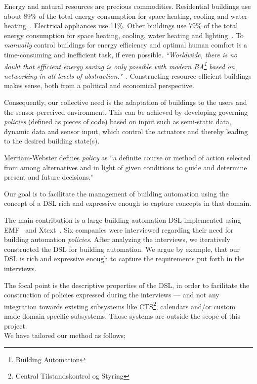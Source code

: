 Energy and natural resources are precious commodities. Residential buildings use about 89\% of the total energy consumption for space heating, cooling and water heating~\cite{janssen2004towards}. Electrical appliances use 11\%. Other buildings use 79\% of the total energy consumption for space heating, cooling, water heating and lighting~\cite{janssen2004towards}. To \textit{manually} control buildings for energy efficiency and optimal human comfort is a time-consuming and inefficient task, if even possible. \textit{``Worldwide, there is no doubt that efficient energy saving is only possible with modern BA\footnote{Building Automation} based on networking in all levels of abstraction."}~\cite{dietrich2010communication}. Constructing resource efficient buildings makes sense, both from a political and economical perspective. 

Consequently, our collective need is the adaptation of buildings to the users and the sensor-perceived environment. This can be achieved by developing governing \textit{policies} (defined as pieces of code) based on input such as semi-static data, dynamic data and sensor input, which control the actuators and thereby leading to the desired building state(s).

Merriam-Webster defines \textit{policy} as ``a definite course or method of action selected from among alternatives and in light of given conditions to guide and determine present and future decisions."

Our goal is to facilitate the management of building automation using the concept of a DSL rich and expressive enough to capture concepts in that domain.

The main contribution is a large building automation DSL implemented using EMF~\cite{emf} and Xtext~\cite{xtext}. Six companies were interviewed regarding their need for building automation \textit{policies}. After analyzing the interviews, we iteratively constructed the DSL for building automation. We argue by example, that our DSL is rich and expressive enough to capture the requirements put forth in the interviews. 

The focal point is the descriptive properties of the DSL, in order to facilitate the construction of policies expressed during the interviews --- and not any integration towards existing subsystems like CTS\footnote{Central Tilstandskontrol og Styring}, calendars and/or custom made domain specific subsystems. Those systems are outside the scope of this project.
\newline\\
We have tailored our method as follows;

